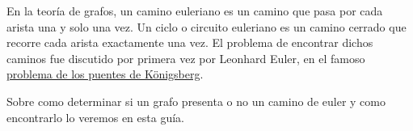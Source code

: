 En la teoría de grafos, un camino euleriano es un camino que pasa por cada arista una y solo una vez. Un ciclo o circuito euleriano es un camino cerrado que recorre cada arista exactamente una vez. El problema de encontrar dichos caminos fue discutido por primera vez por Leonhard Euler, en el famoso \href{https://es.wikipedia.org/wiki/Problema_de_los_puentes_de_K%C3%B6nigsberg}{problema de los puentes de Königsberg}. 
	
Sobre como determinar si un grafo presenta o no un camino de euler y como encontrarlo lo veremos en esta guía.